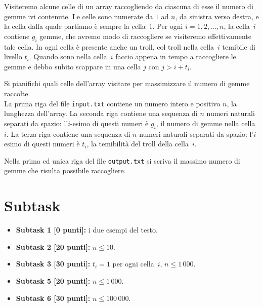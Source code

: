 \renewcommand{\nomebreve}{pushed\_rightwards}
\renewcommand{\titolo}{Pushed towards the right border}

\introduzione{}

Visiteremo alcune celle di un array raccogliendo da ciascuna di esse il numero di gemme ivi contenute.
Le celle sono numerate da $1$ ad $n$, da sinistra verso destra,
e la cella dalla quale partiamo è sempre la cella~$1$.
Per ogni $i=1,2,\ldots, n$, la cella~$i$ contiene $g_i$ gemme, che avremo modo di raccogliere se visiteremo effettivamente tale cella.
In ogni cella è presente anche un troll, col troll nella cella~$i$
temibile di livello $t_i$. Quando sono nella cella~$i$ faccio appena in tempo a raccogliere le gemme e debbo subito scappare in una cella $j$
con $j > i + t_i$.

Si pianifichi quali celle dell'array visitare per massimizzare il numero di gemme raccolte.\\


La prima riga del file \verb'input.txt' contiene un numero intero e positivo $n$, la lunghezza dell'array.
La seconda riga contiene una sequenza di $n$ numeri naturali separati da spazio:
l'$i$-esimo di questi numeri è $g_i$, il numero di gemme nella cella~$i$.
La terza riga contiene una sequenza di $n$ numeri naturali separati da spazio:
l'$i$-esimo di questi numeri è $t_i$, la temibilità del troll della cella~$i$.

Nella prima ed unica riga del file \verb'output.txt'
si scriva il massimo numero di gemme che risulta possibile raccogliere.\\



\section*{Subtask}

  \begin{itemize}
    \item \textbf{Subtask 1 [0 punti]:} i due esempi del testo.
    \item \textbf{Subtask 2 [20 punti]:} $n \leq 10$.
    \item \textbf{Subtask 3 [30 punti]:} $t_i = 1$ per ogni cella~$i$, $n \leq 1\,000$.
    \item \textbf{Subtask 5 [20 punti]:} $n \leq 1\,000$.
    \item \textbf{Subtask 6 [30 punti]:} $n \leq 100\,000$.
  \end{itemize}
  
